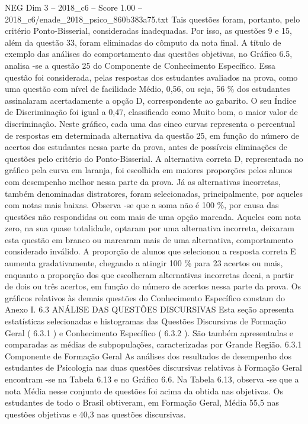 \begin{textsample}{NEG Dim 3 – 2018\_c6 – Score 1.00 – 2018\_c6/enade\_2018\_psico\_860b383a75.txt}
Tais questões foram, portanto, pelo critério Ponto-Bisserial, consideradas inadequadas.
Por isso, as questões 9 e 15, além da questão 33, foram eliminadas do cômputo da nota final.
A título de exemplo das análises do comportamento das questões objetivas, no Gráfico 6.5, analisa -se a questão 25 do Componente de Conhecimento Específico.
Essa questão foi considerada, pelas respostas dos estudantes avaliados na prova, como uma questão com nível de facilidade Médio, 0,56, ou seja, 56 \% dos estudantes assinalaram acertadamente a opção D, correspondente ao gabarito.
O seu Índice de Discriminação foi igual a 0,47, classificado como Muito bom, o maior valor de discriminação.
Neste gráfico, cada uma das cinco curvas representa o percentual de respostas em determinada alternativa da questão 25, em função do número de acertos dos estudantes nessa parte da prova, antes de possíveis eliminações de questões pelo critério do Ponto-Bisserial.
A alternativa correta D, representada no gráfico pela curva em laranja, foi escolhida em maiores proporções pelos alunos com desempenho melhor nessa parte da prova.
Já as alternativas incorretas, também denominadas distratores, foram selecionadas, principalmente, por aqueles com notas mais baixas.
Observa -se que a soma não é 100 \%, por causa das questões não respondidas ou com mais de uma opção marcada.
Aqueles com nota zero, na sua quase totalidade, optaram por uma alternativa incorreta, deixaram esta questão em branco ou marcaram mais de uma alternativa, comportamento considerado inválido.
A proporção de alunos que selecionou a resposta correta E aumenta gradativamente, chegando a atingir 100 \% para 23 acertos ou mais, enquanto a proporção dos que escolheram alternativas incorretas decai, a partir de dois ou três acertos, em função do número de acertos nessa parte da prova.
Os gráficos relativos às demais questões do Conhecimento Específico constam do Anexo I. 6.3 ANÁLISE DAS QUESTÕES DISCURSIVAS Esta seção apresenta estatísticas selecionadas e histogramas das Questões Discursivas de Formação Geral ( 6.3.1 ) e Conhecimento Específico ( 6.3.2 ).
São também apresentadas e comparadas as médias de subpopulações, caracterizadas por Grande Região. 6.3.1 Componente de Formação Geral As análises dos resultados de desempenho dos estudantes de Psicologia nas duas questões discursivas relativas à Formação Geral encontram -se na Tabela 6.13 e no Gráfico 6.6.
Na Tabela 6.13, observa -se que a nota Média nesse conjunto de questões foi acima da obtida nas objetivas.
Os estudantes de todo o Brasil obtiveram, em Formação Geral, Média 55,5 nas questões objetivas e 40,3 nas questões discursivas.

\end{textsample}
